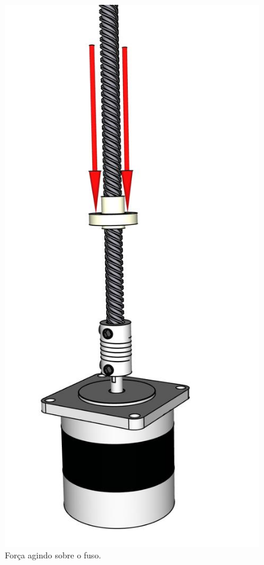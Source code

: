 \begin{figure}[H]
\centering
\caption{Força agindo sobre o fuso.}\label{fig:esqforcafuso}
\includegraphics[scale = 0.3]{figuras/esqforcafuso}
\end{figure}
    
